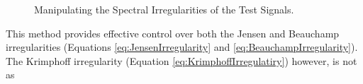 			\begin{figure}[h!]
				\centering
				\qquad
				
				\caption{Manipulating the Spectral Irregularities of the Test Signals.}
				\label{fig:MoveIrregularities}
			\end{figure}

			This method provides effective control over both the Jensen and Beauchamp irregularities (Equations
			\ref{eq:JensenIrregularity} and \ref{eq:BeauchampIrregularity}). The Krimphoff irregularity
			(Equation \ref{eq:KrimphoffIrregulatiry}) however, is not as 

